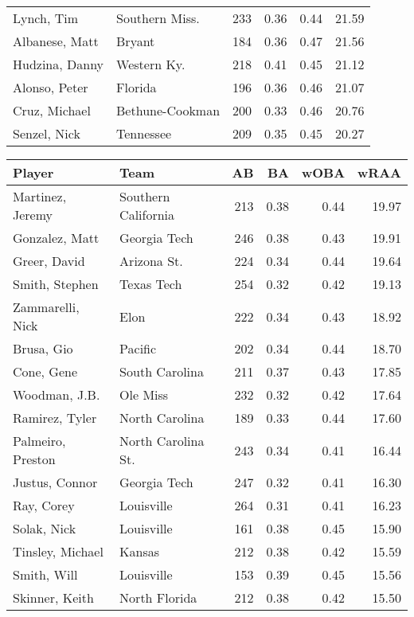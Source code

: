 \documentclass[12pt]{article}
\begin{document}
\begin{landscape}
\begin{table}
\begin{minipage}{.5\linewidth}
\begin{tabular}{llrrrr}
		Lynch, Tim & Southern Miss. & 233 & 0.36 & 0.44 & 21.59 \\ 
		Albanese, Matt & Bryant & 184 & 0.36 & 0.47 & 21.56 \\ 
		Hudzina, Danny & Western Ky. & 218 & 0.41 & 0.45 & 21.12 \\ 
		Alonso, Peter & Florida & 196 & 0.36 & 0.46 & 21.07 \\ 
		Cruz, Michael & Bethune-Cookman & 200 & 0.33 & 0.46 & 20.76 \\ 
		Senzel, Nick & Tennessee & 209 & 0.35 & 0.45 & 20.27 \\ 
		\hline
	\end{tabular} 
\end{minipage}

\begin{minipage}{.5\linewidth}
	\centering
	\begin{tabular}{llrrrr}
		\hline
		Player & Team & AB & BA & wOBA & wRAA \\ 
		\hline
		Martinez, Jeremy & Southern California & 213 & 0.38 & 0.44 & 19.97 \\ 
		Gonzalez, Matt & Georgia Tech & 246 & 0.38 & 0.43 & 19.91 \\ 
		Greer, David & Arizona St. & 224 & 0.34 & 0.44 & 19.64 \\ 
		Smith, Stephen & Texas Tech & 254 & 0.32 & 0.42 & 19.13 \\ 
		Zammarelli, Nick & Elon & 222 & 0.34 & 0.43 & 18.92 \\ 
		Brusa, Gio & Pacific & 202 & 0.34 & 0.44 & 18.70 \\ 
		Cone, Gene & South Carolina & 211 & 0.37 & 0.43 & 17.85 \\ 
		Woodman, J.B. & Ole Miss & 232 & 0.32 & 0.42 & 17.64 \\ 
		Ramirez, Tyler & North Carolina & 189 & 0.33 & 0.44 & 17.60 \\ 
		Palmeiro, Preston & North Carolina St. & 243 & 0.34 & 0.41 & 16.44 \\ 
		Justus, Connor & Georgia Tech & 247 & 0.32 & 0.41 & 16.30 \\ 
		Ray, Corey & Louisville & 264 & 0.31 & 0.41 & 16.23 \\ 
		Solak, Nick & Louisville & 161 & 0.38 & 0.45 & 15.90 \\ 
		Tinsley, Michael & Kansas & 212 & 0.38 & 0.42 & 15.59 \\ 
		Smith, Will & Louisville & 153 & 0.39 & 0.45 & 15.56 \\ 
		Skinner, Keith & North Florida & 212 & 0.38 & 0.42 & 15.50 \\ 

\end{tabular}
\end{minipage}
\end{table}
\end{landscape}
\end{document}
